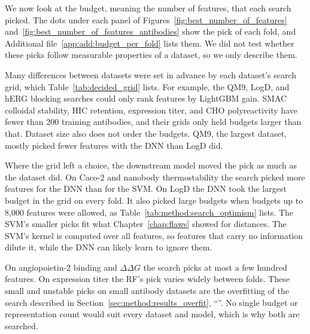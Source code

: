 We now look at the budget, meaning the number of features, that each search picked. The dots under each panel of Figures~\ref{fig:best_number_of_features} and~\ref{fig:best_number_of_features_antibodies} show the pick of each fold, and Additional file~\ref{app:add:budget_per_fold} lists them. We did not test whether these picks follow measurable properties of a dataset, so we only describe them.

Many differences between datasets were set in advance by each dataset's search grid, which Table~\ref{tab:decided_grid} lists. For example, the QM9, LogD, and hERG blocking searches could only rank features by LightGBM gain. SMAC colloidal stability, HIC retention, expression titer, and CHO polyreactivity have fewer than 200 training antibodies, and their grids only held budgets larger than that. Dataset size also does not order the budgets. QM9, the largest dataset, mostly picked fewer features with the DNN than LogD did.

Where the grid left a choice, the downstream model moved the pick as much as the dataset did. On Caco-2 and nanobody thermostability the search picked more features for the DNN than for the SVM. On LogD the DNN took the largest budget in the grid on every fold. It also picked large budgets when budgets up to 8,000 features were allowed, as Table~\ref{tab:method:search_optimism} lists. The SVM's smaller picks fit what Chapter~\ref{chap:flaws} showed for distances. The SVM's kernel is computed over all features, so features that carry no information dilute it, while the DNN can likely learn to ignore them.

On angiopoietin-2 binding and $\Delta\Delta G$ the search picks at most a few hundred features. On expression titer the RF's pick varies widely between folds. These small and unstable picks on small antibody datasets are the overfitting of the search described in Section~\ref{sec:method:results_overfit}, ``''. No single budget or representation count would suit every dataset and model, which is why both are searched.


